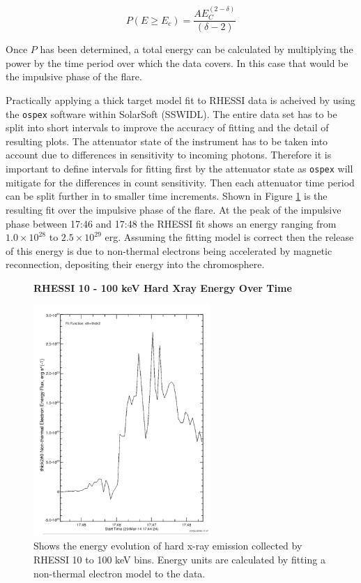 \begin{equation}\label{pnth1}
P(E \geq E_{c}) = \frac{AE_{C}^{(2-\delta)}}{(\delta - 2)}
\end{equation}

Once $P$ has been determined, a total energy can be calculated by multiplying the power by the time period over which the data covers. In this case that would be the impulsive phase of the flare.
  
Practically applying a thick target model fit to RHESSI data is acheived by using the \texttt{ospex} software within SolarSoft (SSWIDL). The entire data set has to be split into short intervals to improve the accuracy of fitting and the detail of resulting plots. The attenuator state of the instrument has to be taken into account due to differences in sensitivity to incoming photons. Therefore it is important to define intervals for fitting first by the attenuator state as \texttt{ospex} will mitigate for the differences in count sensitivity. Then each attenuator time period can be split further in to smaller time increments. Shown in Figure \ref{erhessi} is the resulting fit over the impulsive phase of the flare. At the peak of the impulsive phase between 17:46 and 17:48 the RHESSI fit shows an energy ranging from $1.0{\times}10^{28}$ to $2.5{\times}10^{29}$ erg. Assuming the fitting model is correct then the release of this energy is due to non-thermal electrons being accelerated by magnetic reconnection, depositing their energy into the chromosphere. 

\begin{figure}[H]
  \begin{center}
  \textbf{RHESSI 10 - 100 keV Hard Xray Energy Over Time}\par\medskip
  \includegraphics[width=0.6\textwidth]{rhessi-energy-curve}
  \end{center}
  \caption{Shows the energy evolution of hard x-ray emission collected by RHESSI 10 to 100 keV bins. Energy units are calculated by fitting a non-thermal electron model to the data. }\label{erhessi}
\end{figure}


